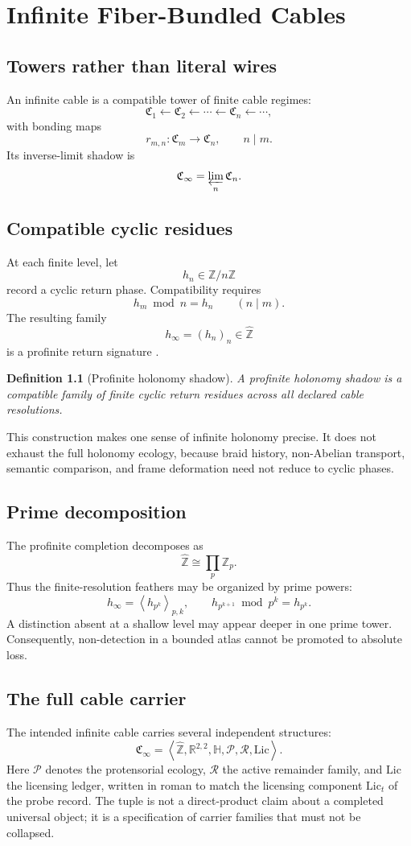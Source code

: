 \documentclass[12pt,openany]{book}
\newtheorem{definition}{Definition}[chapter]
\theoremstyle{remark}
\newcommand{\wideZ}{\widehat{\mathbb Z}}
\newcommand{\typedtuple}[1]{\left\langle #1 \right\rangle}
\begin{document}
\chapter{Infinite Fiber-Bundled Cables}
\label{ch:infinite-cables}

\section{Towers rather than literal wires}
An infinite cable is a compatible tower of finite cable regimes:
\[
\mathfrak C_1
\longleftarrow
\mathfrak C_2
\longleftarrow
\cdots
\longleftarrow
\mathfrak C_n
\longleftarrow
\cdots,
\]
with bonding maps
\[
r_{m,n}:\mathfrak C_m\to\mathfrak C_n,
\qquad n\mid m.
\]
Its inverse-limit shadow is
\[
\mathfrak C_\infty=\varprojlim_n\mathfrak C_n.
\]

\section{Compatible cyclic residues}
At each finite level, let
\[
h_n\in\mathbb Z/n\mathbb Z
\]
record a cyclic return phase. Compatibility requires
\[
h_m\bmod n=h_n
\qquad(n\mid m).
\]
The resulting family
\[
h_\infty=(h_n)_n\in\wideZ
\]
is a profinite return signature \cite{RibesZalesskii}.

\begin{definition}[Profinite holonomy shadow]
A profinite holonomy shadow is a compatible family of finite cyclic return residues across all declared cable resolutions.
\end{definition}

This construction makes one sense of infinite holonomy precise. It does not exhaust the full holonomy ecology, because braid history, non-Abelian transport, semantic comparison, and frame deformation need not reduce to cyclic phases.

\section{Prime decomposition}
The profinite completion decomposes as
\[
\wideZ\cong\prod_p\mathbb Z_p.
\]
Thus the finite-resolution feathers may be organized by prime powers:
\[
h_\infty=\typedtuple{h_{p^k}}_{p,k},
\qquad
h_{p^{k+1}}\bmod p^k=h_{p^k}.
\]
A distinction absent at a shallow level may appear deeper in one prime tower. Consequently, non-detection in a bounded atlas cannot be promoted to absolute loss.

\section{The full cable carrier}
The intended infinite cable carries several independent structures:
\[
\mathfrak C_\infty
=
\typedtuple{
\wideZ,
\mathbb R^{2,2},
\mathbb H,
\mathcal P,
\mathcal R,
\mathrm{Lic}
}.
\]
Here $\mathcal P$ denotes the protensorial ecology, $\mathcal R$ the active remainder family, and $\mathrm{Lic}$ the licensing ledger, written in roman to match the licensing component $\mathrm{Lic}_t$ of the probe record. The tuple is not a direct-product claim about a completed universal object; it is a specification of carrier families that must not be collapsed.
\end{document}
